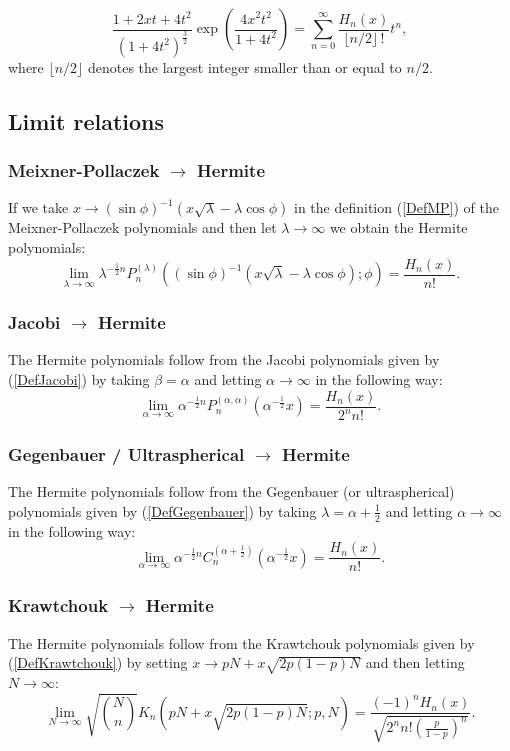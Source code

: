 \documentclass[envcountchap,graybox]{svmono}
\newcounter{rom}
\begin{document}
\begin{equation}
\label{GenHermite5}
\frac{1+2xt+4t^2}{(1+4t^2)^{\frac{3}{2}}}\exp\left(\frac{4x^2t^2}{1+4t^2}\right)
=\sum_{n=0}^{\infty}\frac{H_n(x)}{\lfloor n/2\rfloor\,!}t^n,
\end{equation}
where $\lfloor n/2\rfloor$ denotes the largest integer smaller than or equal to $n/2$.

\subsection*{Limit relations}

\subsubsection*{Meixner-Pollaczek $\rightarrow$ Hermite}
If we take $x\rightarrow (\sin\phi)^{-1}(x\sqrt{\lambda}-\lambda\cos\phi)$
in the definition (\ref{DefMP}) of the Meixner-Pollaczek polynomials and
then let $\lambda\rightarrow\infty$ we obtain the Hermite polynomials:
$$\lim_{\lambda\rightarrow\infty}
\lambda^{-\frac{1}{2}n}P_n^{(\lambda)}
((\sin\phi)^{-1}(x\sqrt{\lambda}-\lambda\cos\phi);\phi)=\frac{H_n(x)}{n!}.$$

\subsubsection*{Jacobi $\rightarrow$ Hermite}
The Hermite polynomials follow from the Jacobi polynomials given by (\ref{DefJacobi}) by
taking $\beta=\alpha$ and letting $\alpha\rightarrow\infty$ in the following way:
$$\lim_{\alpha\rightarrow\infty}
\alpha^{-\frac{1}{2}n}P_n^{(\alpha,\alpha)}(\alpha^{-\frac{1}{2}}x)=\frac{H_n(x)}{2^nn!}.$$

\subsubsection*{Gegenbauer / Ultraspherical $\rightarrow$ Hermite}
The Hermite polynomials follow from the Gegenbauer (or ultraspherical) polynomials given by
(\ref{DefGegenbauer}) by taking $\lambda=\alpha+\frac{1}{2}$ and letting
$\alpha\rightarrow\infty$ in the following way:
$$\lim_{\alpha\rightarrow\infty}
\alpha^{-\frac{1}{2}n}C_n^{(\alpha+\frac{1}{2})}(\alpha^{-\frac{1}{2}}x)=\frac{H_n(x)}{n!}.$$

\subsubsection*{Krawtchouk $\rightarrow$ Hermite}
The Hermite polynomials follow from the Krawtchouk polynomials given by (\ref{DefKrawtchouk})
by setting $x\rightarrow pN+x\sqrt{2p(1-p)N}$ and then letting $N\rightarrow\infty$:
$$\lim_{N\rightarrow\infty}
\sqrt{\binom{N}{n}}K_n(pN+x\sqrt{2p(1-p)N};p,N)
=\frac{\displaystyle (-1)^nH_n(x)}{\displaystyle\sqrt{2^nn!\left(\frac{p}{1-p}\right)^n}}.$$
\end{document}
